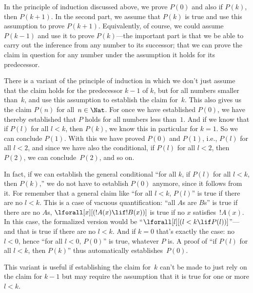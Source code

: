 \documentclass[../../../include/open-logic-section]{subfiles}
\begin{document}

In the principle of induction discussed above, we prove $P(0)$ and
also if $P(k)$, then $P(k+1)$.  In the second part, we assume that
$P(k)$ is true and use this assumption to prove $P(k+1)$.
Equivalently, of course, we could assume $P(k-1)$ and use it to prove
$P(k)$---the important part is that we be able to carry out the
inference from any number to its successor; that we can prove the
claim in question for any number under the assumption it holds for its
predecessor.

There is a variant of the principle of induction in which we don't
just assume that the claim holds for the predecessor $k-1$ of $k$, but
for all numbers smaller than~$k$, and use this assumption to establish
the claim for~$k$. This also gives us the claim $P(n)$ for all~$n \in
\Nat$.  For once we have established $P(0)$, we have thereby
established that $P$ holds for all numbers less than~$1$.  And if we
know that if $P(l)$ for all $l<k$, then $P(k)$, we know this in
particular for $k=1$.  So we can conclude $P(1)$.  With this we have
proved $P(0)$ and $P(1)$, i.e., $P(l)$ for all $l<2$, and since
we have also the conditional, if $P(l)$ for all $l<2$, then $P(2)$, we
can conclude~$P(2)$, and so on.

In fact, if we can establish the general conditional ``for all $k$, if
$P(l)$ for all $l<k$, then $P(k)$,'' we do not have to establish
$P(0)$ anymore, since it follows from it.  For remember that a general
claim like ``for all $l<k$, $P(l)$'' is true if there are no $l<k$.
This is a case of vacuous quantification: ``all $A$s are $B$s'' is
true if there are no $A$s, $\lforall[x][(!A(x) \lif !B(x))]$ is true
if no $x$ satisfies~$!A(x)$. In this case, the formalized version
would be ``$\lforall[l][(l < k \lif P(l))]$''---and that is true if
there are no $l < k$.  And if $k=0$ that's exactly the case: no $l<0$,
hence ``for all $l<0$, $P(0)$'' is true, whatever $P$ is.  A proof of
``if $P(l)$ for all $l<k$, then $P(k)$'' thus automatically
establishes~$P(0)$.

This variant is useful if establishing the claim for~$k$ can't be made
to just rely on the claim for $k-1$ but may require the assumption
that it is true for one or more $l<k$.  
\end{document}
